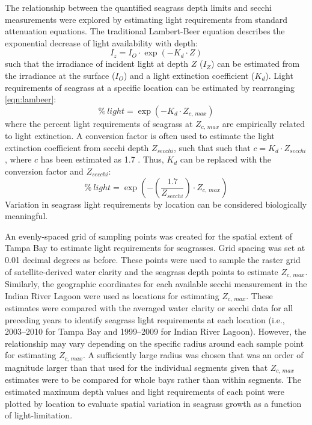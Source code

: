\documentclass[letterpaper,12pt,oneside]{article}\usepackage[]{graphicx}\usepackage[]{color}
\begin{document}
The relationship between the quantified seagrass depth limits and secchi measurements were explored by estimating light requirements from standard attenuation equations.  The traditional Lambert-Beer equation describes the exponential decrease of light availability with depth:
\begin{equation} \label{eqn:lambeer}
I_{z} = I_{O} \cdot \exp\left(-K_{d} \cdot Z\right)
\end{equation}
\noindent such that the irradiance of incident light at depth $Z$ ($I_{Z}$) can be estimated from the irradiance at the surface ($I_{O}$) and a light extinction coefficient ($K_{d}$). Light requirements of seagrass at a specific location can be estimated by rearranging \cref{eqn:lambeer}:
\begin{equation} \label{eqn:perclight}
\% \ light = \exp\left(-K_{d} \cdot Z_{c,\,max}\right)
\end{equation}
\noindent where the percent light requirements of seagrass at $Z_{c,\,max}$ are empirically related to light extinction. A conversion factor is often used to estimate the light extinction coefficient from secchi depth $Z_{secchi}$, such that such that $c = K_{d} \cdot Z_{secchi}$, where $c$ has been estimated as 1.7 \citep{Poole29,Idso74}.  Thus, $K_{d}$ can be replaced with the conversion factor and $Z_{secchi}$:
\begin{equation} \label{eqn:cperclight}
\% \ light = \exp\left(-\left(\frac{1.7}{Z_{secchi}}\right)\cdot Z_{c,\,max}\right)
\end{equation}
\noindent Variation in seagrass light requirements by location can be considered biologically meaningful. 

An evenly-spaced grid of sampling points was created for the spatial extent of Tampa Bay to estimate light requirements for seagrasses. Grid spacing was set at 0.01 decimal degrees as before. These points were used to sample the raster grid of satellite-derived water clarity and the seagrass depth points to  estimate $Z_{c,\,max}$.  Similarly, the geographic coordinates for each available secchi measurement in the Indian River Lagoon were used as locations for estimating $Z_{c,\,max}$.  These estimates were compared with the averaged water clarity or secchi data for all preceding years to identify seagrass light requirements at each location (i.e., 2003--2010 for Tampa Bay and 1999--2009 for Indian River Lagoon).  However, the relationship may vary depending on the specific radius around each sample point for estimating $Z_{c,\,max}$.  A sufficiently large radius was chosen that was an order of magnitude larger than that used for the individual segments given that $Z_{c,\,max}$ estimates were to be compared for whole bays rather than within segments.  The estimated maximum depth values and light requirements of each point were plotted by location to evaluate spatial variation in seagrass growth as a function of light-limitation.
\end{document}
